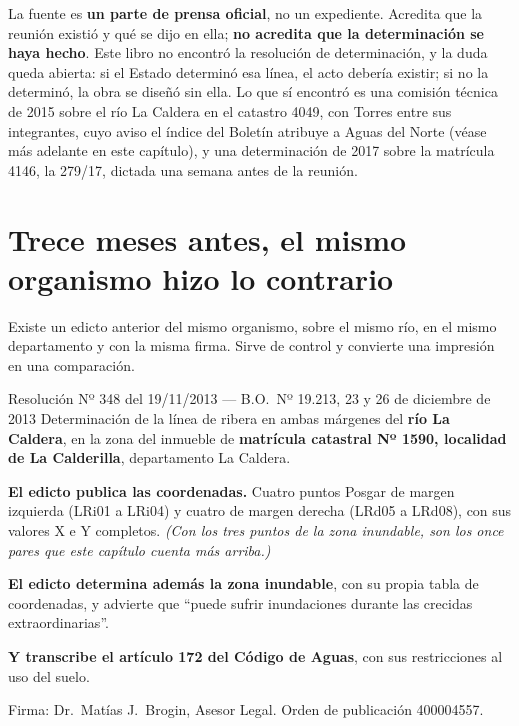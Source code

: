\begin{cautela}
La fuente es \textbf{un parte de prensa oficial}, no un expediente. Acredita que la reunión
existió y qué se dijo en ella; \textbf{no acredita que la determinación se haya hecho}. Este libro no encontró la resolución de determinación, y la duda queda abierta: si el Estado determinó esa línea, el acto debería existir; si no la determinó, la obra se diseñó sin ella. Lo que sí encontró es una comisión técnica de 2015 sobre el río La Caldera en el catastro 4049, con Torres entre sus integrantes, cuyo aviso el índice del Boletín atribuye a Aguas del Norte (véase más adelante en este capítulo), y una determinación de 2017 sobre la matrícula 4146, la 279/17, dictada una semana antes de la reunión.
\end{cautela}

\section{Trece meses antes, el mismo organismo hizo lo contrario}

Existe un edicto anterior del mismo organismo, sobre el mismo río, en el mismo departamento y con la misma firma. Sirve de control y convierte una impresión en una comparación.

\begin{ficha}{Resolución Nº 348 del 19/11/2013 --- B.O.\ Nº 19.213, 23 y 26 de diciembre de 2013}
Determinación de la línea de ribera en ambas márgenes del \textbf{río La Caldera}, en la zona del inmueble de \textbf{matrícula catastral Nº 1590, localidad de La Calderilla}, departamento La Caldera.

\textbf{El edicto publica las coordenadas.} Cuatro puntos Posgar de margen izquierda (LRi01 a LRi04) y cuatro de margen derecha (LRd05 a LRd08), con sus valores X e Y completos. \textit{(Con los tres puntos de la zona inundable, son los once pares que este capítulo cuenta más arriba.)}

\textbf{El edicto determina además la zona inundable}, con su propia tabla de coordenadas, y advierte que ``puede sufrir inundaciones durante las crecidas extraordinarias''.

\textbf{Y transcribe el artículo 172 del Código de Aguas}, con sus restricciones al uso del suelo.

Firma: Dr.\ Matías J.\ Brogin, Asesor Legal. Orden de publicación 400004557.
\end{ficha}

